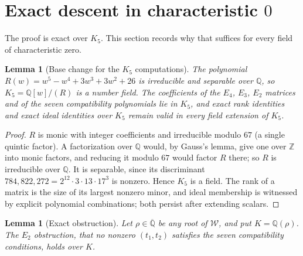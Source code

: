 \documentclass[a4paper,11pt]{article}
\theoremstyle{jsplain}
\newtheorem{lemma}[theorem]{Lemma}
\theoremstyle{jsdef}
\theoremstyle{jsrem}
\begin{document}
\section{Exact descent in characteristic \texorpdfstring{$0$}{0}}\label{ab:sec:lifting}

The proof is exact over $K_5$. This section records why that suffices for every field of characteristic zero.

\begin{lemma}[Base change for the $K_5$ computations]\label{ab:lem:basechange}
The polynomial $R(w)=w^5-w^4+3w^3+3w^2+26$ is irreducible and separable over $\mathbb{Q}$, so $K_5=\mathbb{Q}[w]/(R)$ is a number field. The coefficients of the $E_4$, $E_3$, $E_2$ matrices and of the seven compatibility polynomials lie in $K_5$, and exact rank identities and exact ideal identities over $K_5$ remain valid in every field extension of $K_5$.
\end{lemma}

\begin{proof}
$R$ is monic with integer coefficients and irreducible modulo $67$ (a single quintic factor). A factorization over $\mathbb{Q}$ would, by Gauss's lemma, give one over $\mathbb{Z}$ into monic factors, and reducing it modulo $67$ would factor $R$ there; so $R$ is irreducible over $\mathbb{Q}$. It is separable, since its discriminant $784{,}822{,}272=2^{12}\cdot3\cdot13\cdot17^3$ is nonzero. Hence $K_5$ is a field. The rank of a matrix is the size of its largest nonzero minor, and ideal membership is witnessed by explicit polynomial combinations; both persist after extending scalars.
\end{proof}

\begin{lemma}[Exact obstruction]\label{ab:lem:lifting}
Let $\rho\in\overline{\mathbb{Q}}$ be any root of $\mathcal{W}$, and put $K=\mathbb{Q}(\rho)$. The $E_2$ obstruction, that no nonzero $(t_1,t_2)$ satisfies the seven compatibility conditions, holds over $K$.
\end{lemma}
\end{document}
